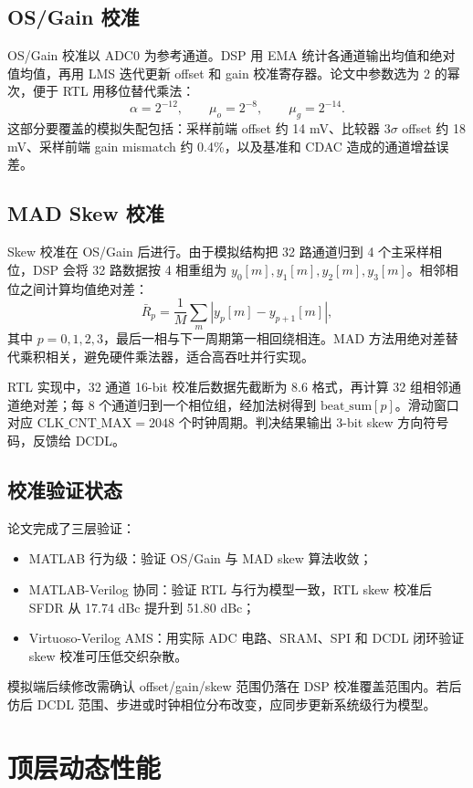 \documentclass[UTF8,zihao=-4]{ctexart}
\begin{document}
\subsection{OS/Gain 校准}

OS/Gain 校准以 ADC0 为参考通道。DSP 用 EMA 统计各通道输出均值和绝对值均值，再用 LMS 迭代更新 offset 和 gain 校准寄存器。论文中参数选为 2 的幂次，便于 RTL 用移位替代乘法：
\[
  \alpha = 2^{-12}, \qquad \mu_o = 2^{-8}, \qquad \mu_g = 2^{-14}.
\]
这部分要覆盖的模拟失配包括：采样前端 offset 约 14 mV、比较器 \(3\sigma\) offset 约 18 mV、采样前端 gain mismatch 约 0.4\%，以及基准和 CDAC 造成的通道增益误差。

\subsection{MAD Skew 校准}

Skew 校准在 OS/Gain 后进行。由于模拟结构把 32 路通道归到 4 个主采样相位，DSP 会将 32 路数据按 4 相重组为 \(y_0[m],y_1[m],y_2[m],y_3[m]\)。相邻相位之间计算均值绝对差：
\[
  \bar{R}_p=\frac{1}{M}\sum_m |y_p[m]-y_{p+1}[m]|,
\]
其中 \(p=0,1,2,3\)，最后一相与下一周期第一相回绕相连。MAD 方法用绝对差替代乘积相关，避免硬件乘法器，适合高吞吐并行实现。

RTL 实现中，32 通道 16-bit 校准后数据先截断为 8.6 格式，再计算 32 组相邻通道绝对差；每 8 个通道归到一个相位组，经加法树得到 \(\mathrm{beat\_sum}[p]\)。滑动窗口对应 \(\mathrm{CLK\_CNT\_MAX}=2048\) 个时钟周期。判决结果输出 3-bit skew 方向符号码，反馈给 DCDL。

\subsection{校准验证状态}

论文完成了三层验证：
\begin{itemize}
  \item MATLAB 行为级：验证 OS/Gain 与 MAD skew 算法收敛；
  \item MATLAB-Verilog 协同：验证 RTL 与行为模型一致，RTL skew 校准后 SFDR 从 17.74 dBc 提升到 51.80 dBc；
  \item Virtuoso-Verilog AMS：用实际 ADC 电路、SRAM、SPI 和 DCDL 闭环验证 skew 校准可压低交织杂散。
\end{itemize}

模拟端后续修改需确认 offset/gain/skew 范围仍落在 DSP 校准覆盖范围内。若后仿后 DCDL 范围、步进或时钟相位分布改变，应同步更新系统级行为模型。

\section{顶层动态性能}
\end{document}
